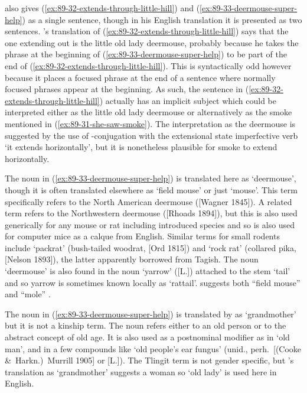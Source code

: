 \citeauthor{swanton:1909} also gives (\ref{ex:89-32-extends-through-little-hill}) and (\ref{ex:89-33-deermouse-super-help}) as a single sentence, though in his English translation it is presented as two sentences.
\citeauthor{swanton:1909}’s translation of (\ref{ex:89-32-extends-through-little-hill}) says that the one extending out is the little old lady deermouse, probably because he takes the phrase  at the beginning of (\ref{ex:89-33-deermouse-super-help}) to be part of the end of (\ref{ex:89-32-extends-through-little-hill}).
This is syntactically odd however because it places a focused phrase at the end of a sentence where normally focused phrases appear at the beginning.
As such, the sentence in (\ref{ex:89-32-extends-through-little-hill}) actually has an implicit subject which could be interpreted either as the little old lady deermouse or alternatively as the smoke mentioned in (\ref{ex:89-31-she-saw-smoke}).
The interpretation as the deermouse is suggested by the use of -conjugation with the extensional state imperfective verb  ‘it extends horizontally’, but it is nonetheless plausible for smoke to extend horizontally.

The noun  in (\ref{ex:89-33-deermouse-super-help}) is translated here as ‘deermouse’, though it is often translated elsewhere as ‘field mouse’ or just ‘mouse’.
This term specifically refers to the North American deermouse ([Wagner 1845]).
A related term  refers to the Northwestern deermouse ([Rhoads 1894]), but this is also used generically for any mouse or rat including introduced species and so is also used for computer mice as a calque from English.
Similar terms for small rodents include  ‘packrat’ (bush-tailed woodrat, [Ord 1815]) and  ‘rock rat’ (collared pika, [Nelson 1893]), the latter apparently borrowed from Tagish.
The noun  ‘deermouse’ is also found in the noun  ‘yarrow’ ([L.]) attached to the stem  ‘tail’ and so yarrow is sometimes known locally as ‘rattail’.
\citeauthor{paul:1930} suggests both “field mouse” and “mole” \parencite[253]{paul:1930}.

The noun  in (\ref{ex:89-33-deermouse-super-help}) is translated by \citeauthor{swanton:1909} as ‘grandmother’ but it is not a kinship term.
The noun  refers either to an old person or to the abstract concept of old age.
It is also used as a postnominal modifier as in  ‘old man’, and in a few compounds like  ‘old people’s ear fungus’ (unid., perh.\ [(Cooke \&\ Harkn.)\ Murrill 1905] or [L.]).
The Tlingit term  is not gender specific, but \citeauthor{swanton:1909}’s translation as ‘grandmother’ suggests a woman so ‘old lady’ is used here in English.


